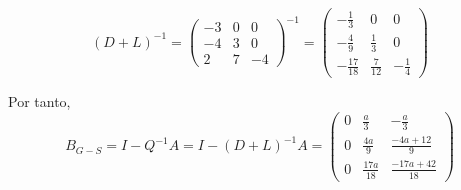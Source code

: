 \documentclass[12pt]{article}
\begin{document}
\begin{ejercicio}
\begin{enumerate}
\begin{enumerate}
            \begin{equation*}
                (D+L)^{-1} = \left( \begin{array}{ccc}
                    -3 & 0 & 0 \\
                    -4 & 3 & 0 \\
                    2 & 7 & -4
                \end{array} \right)^{-1} = \left( \begin{array}{ccc}
                      -\frac{1}{3} &  0	&   0\\
                      -\frac{4}{9}	& \frac{1}{3}	&   0\\
                    -\frac{17}{18}	& \frac{7}{12}	& -\frac{1}{4}
                \end{array} \right)
            \end{equation*}

            Por tanto,
            \begin{equation*}
                B_{G-S} = I-Q^{-1}A = I-(D+L)^{-1}A = \left( \begin{array}{ccc}
                    0 & \frac{a}{3} & -\frac{a}{3} \\
                    0 & \frac{4a}{9} & \frac{-4a+12}{9} \\
                    0 & \frac{17a}{18} & \frac{-17a+42}{18}
                \end{array} \right)
            \end{equation*}


\end{enumerate}
\end{enumerate}
\end{ejercicio}
\end{document}
